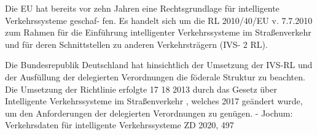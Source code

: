 Die EU hat bereits vor zehn Jahren eine Rechtsgrundlage für intelligente Verkehrssysteme geschaf- fen. Es handelt sich um die RL 2010/40/EU v. 7.7.2010 zum Rahmen für die Einführung intelligenter Verkehrssysteme im Straßenverkehr und für deren Schnittstellen zu anderen Verkehrsträgern (IVS-
2
RL). 

Die Bundesrepublik Deutschland hat hinsichtlich der Umsetzung der IVS-RL und der Ausfüllung der delegierten Verordnungen die föderale Struktur zu beachten. Die Umsetzung der Richtlinie erfolgte
17 18
2013 durch das Gesetz über Intelligente Verkehrssysteme im Straßenverkehr , welches 2017 geändert wurde, um den Anforderungen der delegierten Verordnungen zu genügen.
- Jochum: Verkehrsdaten für intelligente Verkehrssysteme ZD 2020, 497



%

